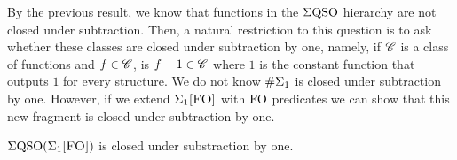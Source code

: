 By the previous result, we know that functions in the $\Sigma{\rm QSO}$ hierarchy are not closed under subtraction. Then, a natural restriction to this question is to ask whether these classes are closed under subtraction by one, namely, if $\mathscr{C}$ is a class of functions and $f \in \mathscr{C}$, is $f-1 \in \mathscr{C}$ where $1$ is the constant function that outputs $1$ for every structure. 
We do not know $\#\Sigma_{1}$ is closed under subtraction by one. However, if we extend $\Sigma_{1}\textsc{[FO]}$ with ${\rm FO}$ predicates we can show that this new fragment is closed under subtraction by one.
\begin{theorem} \label{sigmafo-minusone}
	$\Sigma{\rm QSO}(\Sigma_{1}\textsc{[FO]})$ is closed under substraction by one.
\end{theorem}


 





%


